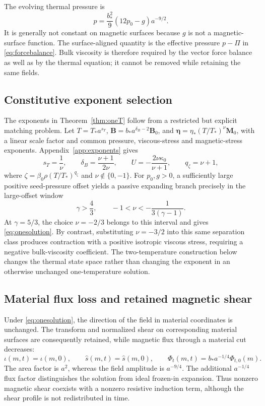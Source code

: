 \documentclass[11pt,a4paper]{article}
\theoremstyle{remark}\newtheorem{remark}{Remark}
\numberwithin{equation}{section}
\newcommand{\BB}{\boldsymbol B}
\newcommand{\MM}{\boldsymbol M}
\newcommand{\etab}{\boldsymbol\eta}
\begin{document}
The evolving thermal pressure is
\begin{equation}
p=\frac{b_*^2}{9}(12p_0-g)a^{-9/2}.
\label{eq:thermalpressure}
\end{equation}
It is generally not constant on magnetic surfaces because $g$ is not a magnetic-surface function. The surface-aligned quantity is the effective pressure $p-\Pi$ in \eqref{eq:forcebalance}. Bulk viscosity is therefore required by the vector force balance as well as by the thermal equation; it cannot be removed while retaining the same fields.

\subsection{Constitutive exponent selection}
The exponents in Theorem~\ref{thm:oneT} follow from a restricted but explicit matching problem. Let $T=T_*a^{s_T}$, $\BB=b_*a^{\delta_B-2}\BB_0$, and $\etab=\eta_*(T/T_*)^\nu\MM_0$, with a linear scale factor and common pressure, viscous-stress and magnetic-stress exponents. Appendix~\ref{app:exponents} gives
\begin{equation}
s_T=\frac1\nu,\qquad
\delta_B=\frac{\nu+1}{2\nu},\qquad
U=-\frac{2\nu\kappa_0}{\nu+1},\qquad
q_\zeta=\nu+1,
\label{eq:exponents}
\end{equation}
where $\zeta=\beta_0\rho(T/T_*)^{q_\zeta}$ and $\nu\notin\{0,-1\}$. For $p_0,g>0$, a sufficiently large positive seed-pressure offset yields a passive expanding branch precisely in the large-offset window
\begin{equation}
\gamma>\frac43,\qquad -1<\nu<-\frac1{3(\gamma-1)}.
\label{eq:passivewindow}
\end{equation}
At $\gamma=5/3$, the choice $\nu=-2/3$ belongs to this interval and gives \eqref{eq:onesolution}. By contrast, substituting $\nu=-3/2$ into this same separation class produces contraction with a positive isotropic viscous stress, requiring a negative bulk-viscosity coefficient. The two-temperature construction below changes the thermal state space rather than changing the exponent in an otherwise unchanged one-temperature solution.

\subsection{Material flux loss and retained magnetic shear}
Under \eqref{eq:onesolution}, the direction of the field in material coordinates is unchanged. The transform and normalized shear on corresponding material surfaces are consequently retained, while magnetic flux through a material cut decreases:
\begin{equation}
\iota(m,t)=\iota(m,0),\qquad
\widehat s(m,t)=\widehat s(m,0),\qquad
\Phi_t(m,t)=b_*a^{-1/4}\Phi_{t,0}(m).
\label{eq:fluxshear}
\end{equation}
The area factor is $a^2$, whereas the field amplitude is $a^{-9/4}$. The additional $a^{-1/4}$ flux factor distinguishes the solution from ideal frozen-in expansion. Thus nonzero magnetic shear coexists with a nonzero resistive induction term, although the shear profile is not redistributed in time.
\end{document}
